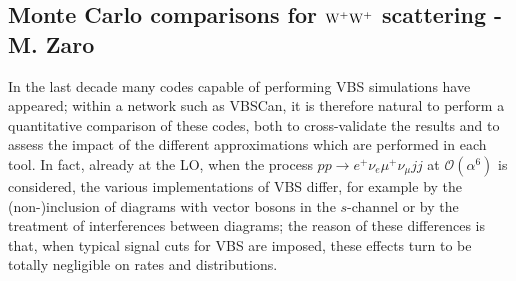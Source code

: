 \subsection{Monte Carlo comparisons for ${\rm W^+ W^+}$ scattering - M. Zaro}
In the last decade many codes capable of performing VBS simulations have appeared; within a network such as VBSCan, it is therefore natural to perform 
a quantitative comparison of these codes, both to cross-validate the results and to assess the impact of the different approximations which are performed in each tool. In fact, 
already at the LO, when the process $p p \to e^+ \nu_e \mu^+ \nu_\mu j j$ at $\mathcal O (\alpha^6)$ is considered, the various implementations of VBS differ, for example
by the (non-)inclusion of diagrams with vector bosons in the $s$-channel or by the treatment of interferences between diagrams; the reason of these differences is that, 
when typical signal cuts for VBS are imposed, these effects turn to be totally negligible on rates and distributions.

